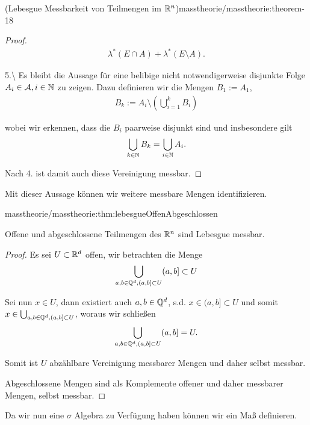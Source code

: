 \begin{theorem}{(Lebesgue Messbarkeit von Teilmengen im \protect\(\mathbb{R}^n\protect\))}{masstheorie/masstheorie:theorem-18}
\begin{proof}
\begin{align*}
\lambda^\ast(E\cap A) + \lambda^\ast(E\setminus A).
\end{align*}
\par
5.\textbackslash{} Es bleibt die Aussage für eine belibige nicht notwendigerweise disjunkte Folge \(A_i\in\mathcal{A}, i\in\mathbb{N}\) zu zeigen. Dazu definieren wir die Mengen \(B_1:=A_1\),
\begin{align*}
B_k := A_i\setminus \left(\bigcup_{i=1}^k B_i  \right)
\end{align*}
\par
wobei wir erkennen, dass die \(B_i\) paarweise disjunkt sind und insbesondere gilt
\begin{align*}
\bigcup_{k\in\mathbb{N}} B_k = \bigcup_{i\in\mathbb{N}} A_i.
\end{align*}
\par
Nach 4. ist damit auch diese Vereinigung messbar.
\end{proof}

\par
Mit dieser Aussage können wir weitere messbare Mengen identifizieren.
\begin{lemma}{}{masstheorie/masstheorie:thm:lebesgueOffenAbgeschlossen}



\par
Offene und abgeschlossene Teilmengen des \(\mathbb{R}^n\) sind Lebesgue messbar.
\end{lemma}

\begin{proof}
 Es sei \(U\subset\mathbb{R}^d\) offen, wir betrachten die Menge
\begin{align*}
\bigcup_{a,b\in \mathbb{Q}^d, (a,b]\subset U} (a,b]\subset U
\end{align*}
\par
Sei nun \(x\in U\), dann existiert auch \(a,b\in\mathbb{Q}^d\), s.d. \(x\in(a,b]\subset U\) und somit \(x\in\bigcup_{a,b\in \mathbb{Q}^d, (a,b]\subset U}\), woraus wir schließen
\begin{align*}
\bigcup_{a,b\in \mathbb{Q}^d, (a,b]\subset U} (a,b] = U.
\end{align*}
\par
Somit ist \(U\) abzählbare Vereinigung messbarer Mengen und daher selbst messbar.

\par
Abgeschlossene Mengen sind als Komplemente offener und daher messbarer Mengen, selbst messbar.
\end{proof}

\par
Da wir nun eine \(\sigma\) Algebra zu Verfügung haben können wir ein Maß definieren.


\end{theorem}
